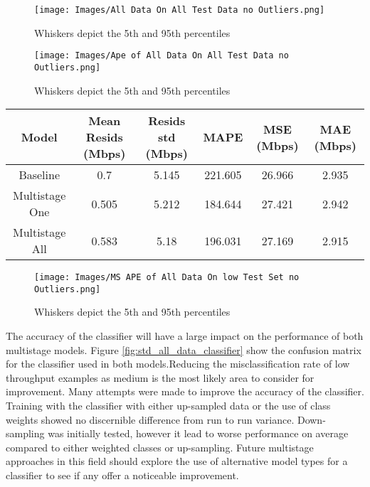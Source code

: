 \begin{figure}[!htb]
\texttt{[image: Images/All Data On All Test Data no Outliers.png]}
\centering
\caption{Whiskers depict the 5th and 95th percentiles}
\label{fig:std_all_data_resids_outliers}
\end{figure}

\begin{figure}[!htb]
\texttt{[image: Images/Ape of All Data On All Test Data no Outliers.png]}
\centering
\caption{Whiskers depict the 5th and 95th percentiles}
\label{fig:std_all_data_ape_outliers}
\end{figure}

\begin{table}[!htb]
\centering
\begin{tabular}{|c|c|c|c|c|c|}
\hline
{Model} & {Mean Resids (Mbps)} & {Resids std (Mbps)} & {MAPE} & {MSE (Mbps)} & {MAE (Mbps)}\\
\hline
Baseline & 0.7 & 5.145 & 221.605 & 26.966 & 2.935\\
\hline
Multistage One & 0.505 & 5.212 & 184.644 & 27.421 & 2.942\\
\hline
Multistage All & 0.583 & 5.18 & 196.031 & 27.169 & 2.915\\
\hline
\end{tabular}
\label{tab:std_all_data_tab}
\end{table}

\begin{figure}[!htb]
\texttt{[image: Images/MS APE of All Data On low Test Set no Outliers.png]}
\centering
\caption{Whiskers depict the 5th and 95th percentiles}
\label{fig:ms_std_all_data_ape_outliers}
\end{figure}

The accuracy of the classifier will have a large impact on the performance of both multistage models. Figure \ref{fig:std_all_data_classifier} show the confusion matrix for the classifier used in both models.Reducing the misclassification rate of low throughput examples as medium is the most likely area to consider for improvement. Many attempts were made to improve the accuracy of the classifier. Training with the classifier with either up-sampled data or the use of class weights showed no discernible difference from run to run variance. Down-sampling was initially tested, however it lead to worse performance on average compared to either weighted classes or up-sampling. Future multistage approaches in this field should explore the use of alternative model types for a classifier to see if any offer a noticeable improvement.

